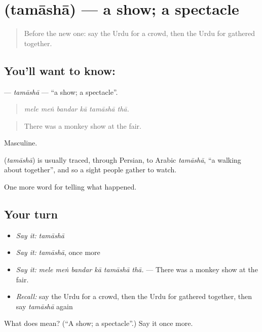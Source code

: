 \section[\texorpdfstring{\ur{تماشا} (tamāshā)}{تماشا (tamāshā)}]{ (tamāshā) — a show; a spectacle}

\label{lesson:UR-C321-tamasha}



\begin{quote}
Before the new one: say the Urdu for a crowd, then the Urdu for gathered together.
\end{quote}

\subsection*{You'll want to know: }
\textbf{} — \emph{tamāshā} — \textquotedblleft{}a show; a spectacle\textquotedblright{}.

\begin{quote}
     
\end{quote}

\begin{quote}
\emph{mele meṅ bandar kā tamāshā thā.}
\end{quote}

\begin{quote}
There was a monkey show at the fair.
\end{quote}

Masculine.

\begin{cousinweb}
\textbf{} (\emph{tamāshā}) is usually traced, through Persian, to Arabic \emph{tamāshā}, \textquotedblleft{}a walking about together\textquotedblright{}, and so a sight people gather to watch.
\end{cousinweb}

\begin{grammarlens}[title={What you've built}]
One more word for telling what happened.
\end{grammarlens}

\subsection*{Your turn}
\begin{itemize}
\raggedright
  \item \emph{Say it:} \emph{tamāshā}
  \item \emph{Say it:} \emph{tamāshā}, once more
  \item \emph{Say it:} \emph{mele meṅ bandar kā tamāshā thā.} — There was a monkey show at the fair.
  \item \emph{Recall:} say the Urdu for a crowd, then the Urdu for gathered together, then say \emph{tamāshā} again
\end{itemize}

\begin{tcolorbox}[breakable,colback=teal!4,colframe=teal!35!black,title={Before you move on}]
What does  mean? (\textquotedblleft{}A show; a spectacle\textquotedblright{}.) Say it once more.
\end{tcolorbox}
